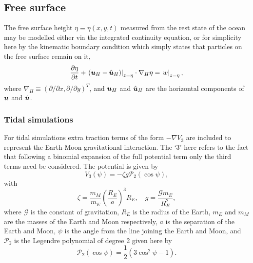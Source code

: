 \subsection{Free surface}\label{Sect:FS}
The free surface height $\eta\equiv\eta(x,y,t)$ measured from the rest state of the ocean
may be modelled either via the integrated continuity equation,
or for simplicity here by the kinematic boundary condition which simply states
that particles on the free surface remain on it, \ie
\begin{equation}\label{freesurf2}
\frac{\partial \eta}{\partial t}+\left.({{\mbox{\boldmath$u$}}}_H-\hat{{\mbox{\boldmath$u$}}}_H)\right|_{z=\eta}\cdot\nabla_H \eta =\left.w\right|_{z=\eta},
\end{equation}
where $\nabla_H\equiv(\partial/\partial x,\partial/\partial y)^T$, and
${\mbox{\boldmath$u$}}_H$ and $\hat{{\mbox{\boldmath$u$}}}_H$ are the horizontal components of ${\mbox{\boldmath$u$}}$ and
$\hat{{\mbox{\boldmath$u$}}}$.


\subsubsection{Tidal simulations}\label{sect:tidal}
For tidal simulations extra traction terms
of the form $-\nabla V_3$ are included to represent the Earth-Moon gravitational
interaction. The `3' here refers to the fact that following a
binomial expansion of the full potential term only the third terms
need be considered. The potential is given by
\begin{equation}
V_3(\psi) = -\zeta g \mathcal{P}_2(\cos\psi),
\end{equation}
with
\begin{equation}
\zeta = \frac{m_M}{m_E}\left(\frac{R_E}{a}\right)^3R_E,\quad
g=\frac{\mathcal{G}m_E}{R_E^2},
\end{equation}
where $\mathcal{G}$ is the constant of gravitation, $R_E$ is the
radius of the Earth, $m_E$ and $m_M$ are the masses of the Earth and
Moon respectively, $a$ is the separation of the Earth and Moon,
$\psi$ is the angle from the line joining the Earth and Moon, and
$\mathcal{P}_2$ is the Legendre polynomial of degree 2 given here by
\begin{equation}
\mathcal{P}_2(\cos\psi)=\frac{1}{2}(3\cos^2\psi -1).
\end{equation}

